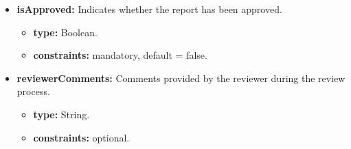 \begin{itemize} [leftmargin=0.75cm, noitemsep, label=\textbullet]
    \begin{itemize} [leftmargin=0.75cm, noitemsep, label=$\circ$]

        \item \textbf{type:} DateTime.

        \item \textbf{constraints:} optional (null if not yet reviewed).

    \end{itemize}

    \item \textbf{isApproved:} Indicates whether the report has been approved.
    
    \begin{itemize} [leftmargin=0.75cm, noitemsep, label=$\circ$]

        \item \textbf{type:} Boolean.

        \item \textbf{constraints:} mandatory, default = false.

    \end{itemize}

    \item \textbf{reviewerComments:} Comments provided by the reviewer during the review process.
    
    \begin{itemize} [leftmargin=0.75cm, noitemsep, label=$\circ$]

        \item \textbf{type:} String.

        \item \textbf{constraints:} optional.

    \end{itemize}

\end{itemize}